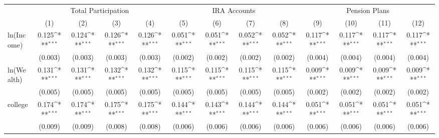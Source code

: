 {
\def\sym#1{\ifmmode^{#1}\else\(^{#1}\)\fi}
\begin{tabular*}{\linewidth}{l@{\extracolsep{\fill}}*{12}{c}}
\toprule
                &\multicolumn{4}{c}{Total Participation}                                    &\multicolumn{4}{c}{IRA Accounts}                                           &\multicolumn{4}{c}{Pension Plans}                                          \\
                &\multicolumn{1}{c}{(1)}         &\multicolumn{1}{c}{(2)}         &\multicolumn{1}{c}{(3)}         &\multicolumn{1}{c}{(4)}         &\multicolumn{1}{c}{(5)}         &\multicolumn{1}{c}{(6)}         &\multicolumn{1}{c}{(7)}         &\multicolumn{1}{c}{(8)}         &\multicolumn{1}{c}{(9)}         &\multicolumn{1}{c}{(10)}         &\multicolumn{1}{c}{(11)}         &\multicolumn{1}{c}{(12)}         \\
\midrule
ln(Income)      &    0.125\sym{***}&    0.124\sym{***}&    0.126\sym{***}&    0.126\sym{***}&    0.051\sym{***}&    0.051\sym{***}&    0.052\sym{***}&    0.052\sym{***}&    0.117\sym{***}&    0.117\sym{***}&    0.117\sym{***}&    0.117\sym{***}\\
                &  (0.003)         &  (0.003)         &  (0.003)         &  (0.003)         &  (0.002)         &  (0.002)         &  (0.002)         &  (0.002)         &  (0.004)         &  (0.004)         &  (0.004)         &  (0.004)         \\
\addlinespace
ln(Wealth)      &    0.131\sym{***}&    0.131\sym{***}&    0.132\sym{***}&    0.132\sym{***}&    0.115\sym{***}&    0.115\sym{***}&    0.115\sym{***}&    0.115\sym{***}&    0.009\sym{***}&    0.009\sym{***}&    0.009\sym{***}&    0.009\sym{***}\\
                &  (0.005)         &  (0.005)         &  (0.005)         &  (0.005)         &  (0.005)         &  (0.005)         &  (0.005)         &  (0.005)         &  (0.002)         &  (0.002)         &  (0.002)         &  (0.002)         \\
\addlinespace
college         &    0.174\sym{***}&    0.174\sym{***}&    0.175\sym{***}&    0.175\sym{***}&    0.144\sym{***}&    0.143\sym{***}&    0.144\sym{***}&    0.144\sym{***}&    0.051\sym{***}&    0.051\sym{***}&    0.051\sym{***}&    0.051\sym{***}\\
                &  (0.009)         &  (0.009)         &  (0.008)         &  (0.008)         &  (0.006)         &  (0.006)         &  (0.006)         &  (0.006)         &  (0.006)         &  (0.006)         &  (0.006)         &  (0.006)         \\

\end{tabular*}}
